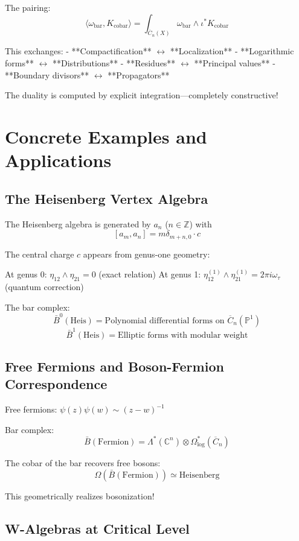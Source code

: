 The pairing:
$$\langle \omega_{\text{bar}}, K_{\text{cobar}} \rangle = \int_{\overline{C}_n(X)} \omega_{\text{bar}} \wedge \iota^* K_{\text{cobar}}$$

This exchanges:
- **Compactification** $\leftrightarrow$ **Localization**  
- **Logarithmic forms** $\leftrightarrow$ **Distributions**
- **Residues** $\leftrightarrow$ **Principal values**
- **Boundary divisors** $\leftrightarrow$ **Propagators**

The duality is computed by explicit integration—completely constructive!

\section{Concrete Examples and Applications}

\subsection{The Heisenberg Vertex Algebra}

The Heisenberg algebra is generated by $a_n$ ($n \in \mathbb{Z}$) with
$$[a_m, a_n] = m\delta_{m+n,0} \cdot c$$

The central charge $c$ appears from genus-one geometry:

At genus 0: $\eta_{12} \wedge \eta_{21} = 0$ (exact relation)
At genus 1: $\eta_{12}^{(1)} \wedge \eta_{21}^{(1)} = 2\pi i \omega_\tau$ (quantum correction)

The bar complex:
$$\bar{B}^0(\text{Heis}) = \text{Polynomial differential forms on } \overline{C}_n(\mathbb{P}^1)$$
$$\bar{B}^1(\text{Heis}) = \text{Elliptic forms with modular weight}$$

\subsection{Free Fermions and Boson-Fermion Correspondence}

Free fermions: $\psi(z)\psi(w) \sim (z-w)^{-1}$

Bar complex:
$$\bar{B}(\text{Fermion}) = \Lambda^*(\mathbb{C}^n) \otimes \Omega^*_{\text{log}}(\overline{C}_n)$$

The cobar of the bar recovers free bosons:
$$\Omega(\bar{B}(\text{Fermion})) \simeq \text{Heisenberg}$$

This geometrically realizes bosonization!

\subsection{W-Algebras at Critical Level}

